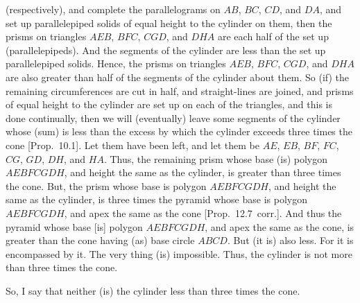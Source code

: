 (respectively), and complete the parallelograms on $AB$, $BC$, $CD$, and $DA$, and set up parallelepiped solids
of equal height to the cylinder on them, then the prisms on triangles $AEB$, $BFC$, $CGD$, and $DHA$ are each half
of the set up (parallelepipeds). And the segments of the cylinder are less than the set up parallelepiped solids. 
Hence, the prisms on triangles $AEB$, $BFC$, $CGD$, and $DHA$ are also greater than half of the segments
of the cylinder about them. So (if) the remaining circumferences are cut in half, and straight-lines are joined,
and prisms of equal height to the cylinder are set up on each of the triangles, and this is done
continually,  then we will (eventually) leave some segments of the cylinder whose (sum) is less than the excess by which the
cylinder exceeds three times the cone [Prop.~10.1]. Let them have been left, and let them be $AE$, $EB$, $BF$, $FC$, $CG$,
$GD$, $DH$, and $HA$. Thus, the remaining prism whose base (is) polygon $AEBFCGDH$, and height  the
same as the cylinder, is greater than three times the cone. But, the prism whose base is polygon $AEBFCGDH$,
and height the same as the cylinder,  is three times the pyramid whose base is polygon $AEBFCGDH$, and
apex the same as the cone [Prop.~12.7~corr.]. And thus the pyramid whose base [is] polygon 
$AEBFCGDH$, and apex the same as the cone, is greater than the cone having (as) base circle $ABCD$. But (it is)
also less. For it is encompassed by it. The very thing (is) impossible. Thus, the cylinder is not more than
three times the cone.

So, I say that neither (is) the cylinder less than three times the cone.

